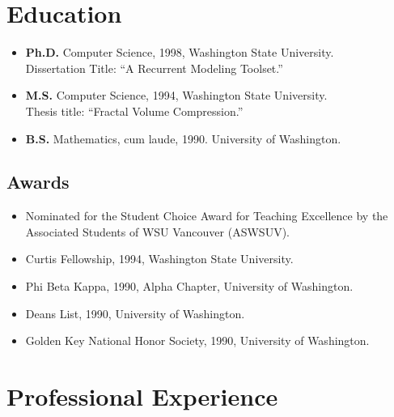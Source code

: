 \documentclass[10pt]{article}
\begin{document}
\section*{Education}

\begin{itemize}
\item {\bf Ph.D.} Computer Science, 1998,
Washington State University. \\
Dissertation Title: ``A Recurrent Modeling Toolset.''

\item {\bf M.S.} Computer Science, 1994,
Washington State University. \\
Thesis title: ``Fractal Volume Compression.''

\item {\bf B.S.} Mathematics, cum laude, 1990.
University of Washington. 
\end{itemize}

\subsection*{Awards}

\begin{itemize}
\item Nominated for the Student Choice Award for Teaching
  Excellence by the Associated Students of WSU Vancouver (ASWSUV).
\item Curtis Fellowship, 1994, Washington State University.
\item Phi Beta Kappa, 1990, Alpha Chapter, University of Washington.
\item Deans List, 1990, University of Washington.
\item Golden Key National Honor Society, 1990, University of Washington.
\end{itemize}


\section*{Professional Experience}
\end{document}
